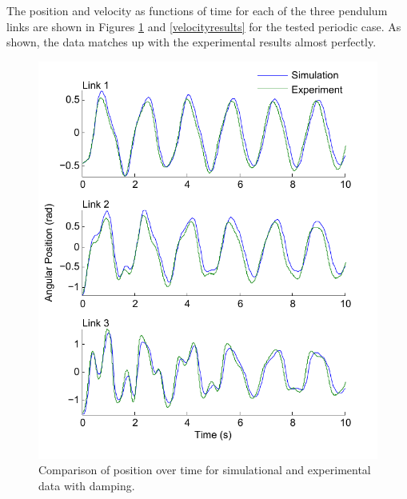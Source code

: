 The position and velocity as functions of time for each of the three pendulum links are shown in Figures \ref{positionresults} and \ref{velocityresults} for the tested periodic case.  As shown, the data matches up with the experimental results almost perfectly.

\begin{figure}[H]
\centering
\includegraphics[scale=0.65]{comparison_position_damped.pdf}
\caption{Comparison of position over time for simulational and experimental data with damping.}
\label{positionresults}
\end{figure} 

